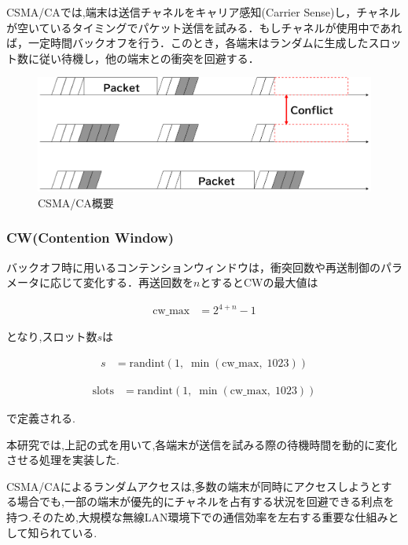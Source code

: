\documentclass[a4paper, 10pt]{ltjsarticle}
\begin{document}
CSMA/CAでは,端末は送信チャネルをキャリア感知(Carrier Sense)し，チャネルが空いているタイミングでパケット送信を試みる．もしチャネルが使用中であれば，一定時間バックオフを行う．このとき，各端末はランダムに生成したスロット数に従い待機し，他の端末との衝突を回避する．



\begin{figure}[H]
  \centering
  \includegraphics[width=1\columnwidth]{./assets/csmaca-1.png}
  \caption{CSMA/CA概要}
  \label{CSMA/CA}
\end{figure}

\subsubsection{CW(Contention Window)}
バックオフ時に用いるコンテンションウィンドウは，衝突回数や再送制御のパラメータに応じて変化する．再送回数を$n$とするとCWの最大値は



\begin{align}
  \text{cw\_max} &= 2^{4 + n} - 1
\end{align}

となり,スロット数$s$は

\begin{align}
  s &= \mathrm{randint}(1, \; \min(\text{cw\_max}, \; 1023))
\end{align}

\begin{align}
  \text{slots} &= \mathrm{randint}(1, \; \min(\text{cw\_max}, \; 1023))
\end{align}


で定義される.

本研究では,上記の式を用いて,各端末が送信を試みる際の待機時間を動的に変化させる処理を実装した.

CSMA/CAによるランダムアクセスは,多数の端末が同時にアクセスしようとする場合でも,一部の端末が優先的にチャネルを占有する状況を回避できる利点を持つ.そのため,大規模な無線LAN環境下での通信効率を左右する重要な仕組みとして知られている.
\end{document}
